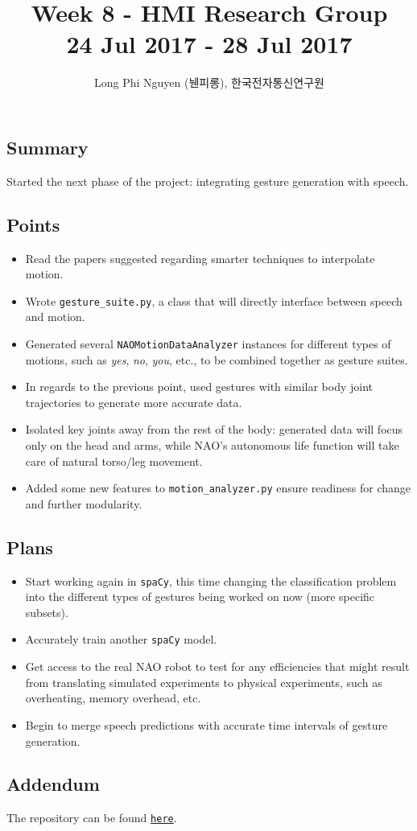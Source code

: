\documentclass{article}
\title{Week 8 - HMI Research Group \\ \large 24 Jul 2017 - 28 Jul 2017}
\author{Long Phi Nguyen (뉀피롱), 한국전자통신연구원}
\begin{document}
  \maketitle


  \subsection*{Summary} Started the next phase of the project: integrating gesture generation with speech.

  \subsection*{Points}
  \begin{itemize}
    \item Read the papers suggested regarding smarter techniques to interpolate motion.
    \item Wrote \verb|gesture_suite.py|, a class that will directly interface between speech and motion.
    \item Generated several \verb|NAOMotionDataAnalyzer| instances for different types of motions, such as \emph{yes}, \emph{no}, \emph{you}, etc., to be combined together as gesture suites.
    \item In regards to the previous point, used gestures with similar body joint trajectories to generate more accurate data.
    \item Isolated key joints away from the rest of the body: generated data will focus only on the head and arms, while NAO's autonomous life function will take care of natural torso/leg movement.
    \item Added some new features to \verb|motion_analyzer.py| ensure readiness for change and further modularity.
  \end{itemize}

  \subsection*{Plans}
  \begin{itemize}
    \item Start working again in \verb|spaCy|, this time changing the classification problem into the different types of gestures being worked on now (more specific subsets).
    \item Accurately train another \verb|spaCy| model.
    \item Get access to the real NAO robot to test for any efficiencies that might result from translating simulated experiments to physical experiments, such as overheating, memory overhead, etc.
    \item Begin to merge speech predictions with accurate time intervals of gesture generation.
  \end{itemize}

  \subsection*{Addendum}
  The repository can be found \href{https://github.com/longnguyen1997/nao_animations}{\texttt{here}}.
\end{document}
